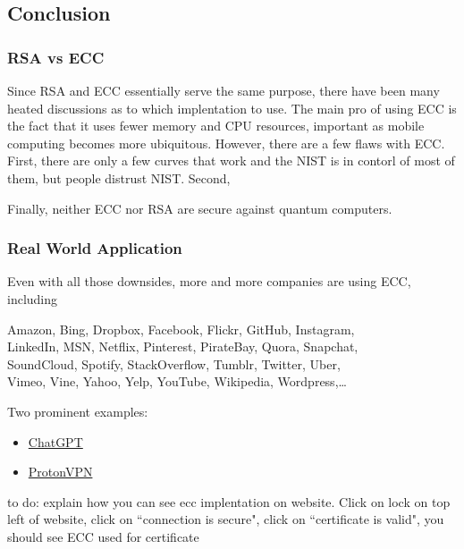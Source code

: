 \documentclass{article}
\begin{document}
\subsection*{Conclusion}

    \subsubsection*{RSA vs ECC}

    Since RSA and ECC essentially serve the same purpose, there have been many heated discussions as to which implentation to use. The main pro of using ECC is the fact that it uses fewer memory and CPU resources, important as mobile computing becomes more ubiquitous. However, there are a few flaws with ECC. First, there are only a few curves that work and the NIST is in contorl of most of them, but people distrust NIST. Second, 

    \vspace{2mm}
    Finally, neither ECC nor RSA are secure against quantum computers. 



    \subsubsection*{Real World Application}

    Even with all those downsides, more and more companies are using ECC, including

    \begin{center}
        Amazon, Bing, Dropbox, Facebook, Flickr, GitHub, Instagram, \\
        LinkedIn, MSN, Netflix, Pinterest, PirateBay, Quora, Snapchat, \\
        SoundCloud, Spotify, StackOverflow, Tumblr, Twitter, Uber, \\
        Vimeo, Vine, Yahoo, Yelp, YouTube, Wikipedia, Wordpress,\dots
    \end{center}

Two prominent examples:
    \begin{itemize}
        \item \href{https://chat.openai.com/chat}{ChatGPT}
        \item \href{https://proton.me/blog/elliptic-curve-cryptography}{ProtonVPN}
    \end{itemize}

    to do: explain how you can see ecc implentation on website. Click on lock on top left of website, click on ``connection is secure", click on ``certificate is valid", you should see ECC used for certificate
\end{document}
